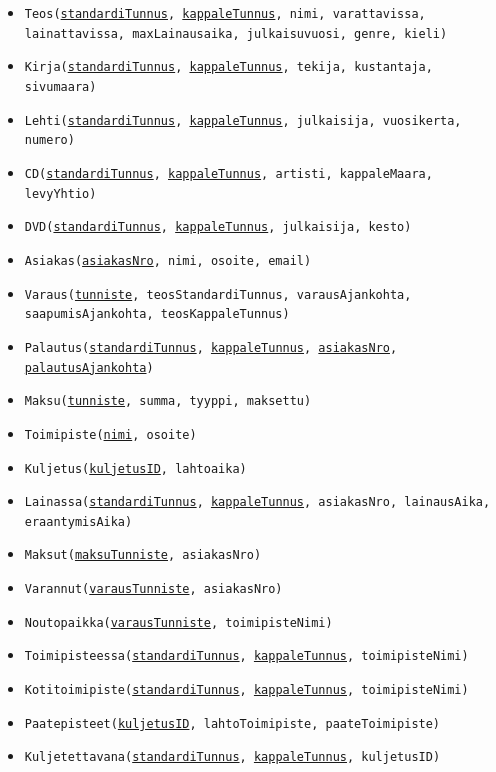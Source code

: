 \documentclass[12pt,titlepage] {article}
\begin{document}
\begin{itemize}
	\item \texttt{Teos(\underline{standardiTunnus}, \underline{kappaleTunnus}, nimi, varattavissa, lainattavissa, maxLainausaika, julkaisuvuosi, genre, kieli)}
	\item \texttt{Kirja(\underline{standardiTunnus}, \underline{kappaleTunnus}, tekija, kustantaja, sivumaara)}
	\item \texttt{Lehti(\underline{standardiTunnus}, \underline{kappaleTunnus}, julkaisija, vuosikerta, numero)}
	\item \texttt{CD(\underline{standardiTunnus}, \underline{kappaleTunnus}, artisti, kappaleMaara, levyYhtio)}
	\item \texttt{DVD(\underline{standardiTunnus}, \underline{kappaleTunnus}, julkaisija, kesto)}
	\item \texttt{Asiakas(\underline{asiakasNro}, nimi, osoite, email)}
	\item \texttt{Varaus(\underline{tunniste}, teosStandardiTunnus, varausAjankohta, saapumisAjankohta, teosKappaleTunnus)}
	\item \texttt{Palautus(\underline{standardiTunnus}, \underline{kappaleTunnus}, \underline{asiakasNro}, \underline{palautusAjankohta})}
	\item \texttt{Maksu(\underline{tunniste}, summa, tyyppi, maksettu)}
	\item \texttt{Toimipiste(\underline{nimi}, osoite)}
	\item \texttt{Kuljetus(\underline{kuljetusID}, lahtoaika)}
\end{itemize}

\begin{itemize}
	\item \texttt{Lainassa(\underline{standardiTunnus}, \underline{kappaleTunnus}, asiakasNro, lainausAika, eraantymisAika)}
	\item \texttt{Maksut(\underline{maksuTunniste}, asiakasNro)}
	\item \texttt{Varannut(\underline{varausTunniste}, asiakasNro)}
	\item \texttt{Noutopaikka(\underline{varausTunniste}, toimipisteNimi)}
	\item \texttt{Toimipisteessa(\underline{standardiTunnus}, \underline{kappaleTunnus}, toimipisteNimi)}
	\item \texttt{Kotitoimipiste(\underline{standardiTunnus}, \underline{kappaleTunnus}, toimipisteNimi)}
	\item \texttt{Paatepisteet(\underline{kuljetusID}, lahtoToimipiste, paateToimipiste)}
	\item \texttt{Kuljetettavana(\underline{standardiTunnus}, \underline{kappaleTunnus}, kuljetusID)}
\end{itemize}
\end{document}
